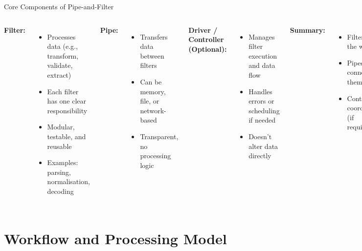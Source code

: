 \documentclass[aspectratio=169, table]{beamer}
\begin{document}
\begin{frame}[fragile]{Core Components of Pipe-and-Filter}
	\vspace{20pt}
	\begin{columns}[T]
		\textbf{Filter:}
		\begin{itemize}
			\item Processes data (e.g., transform, validate, extract)
			\item Each filter has one clear responsibility
			\item Modular, testable, and reusable
			\item Examples: parsing, normalisation, decoding
		\end{itemize}
		
		\textbf{Pipe:}
		\begin{itemize}
			\item Transfers data between filters
			\item Can be memory, file, or network-based
			\item Transparent, no processing logic
		\end{itemize}
		
		\textbf{Driver / Controller (Optional):}
		\begin{itemize}
			\item Manages filter execution and data flow
			\item Handles errors or scheduling if needed
			\item Doesn’t alter data directly
		\end{itemize}
		
		\textbf{Summary:}
		\begin{itemize}
			\item Filters do the work
			\item Pipes connect them
			\item Controllers coordinate (if required)
		\end{itemize}
	\end{columns}
\end{frame}

\section{Workflow and Processing Model}
\end{document}
